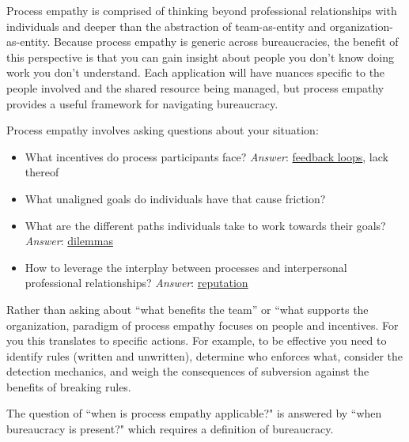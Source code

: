 Process empathy is comprised of thinking beyond professional relationships with individuals and deeper than the abstraction of team-as-entity and organization-as-entity. 
Because process empathy is generic across bureaucracies, the benefit of this perspective is that you can gain insight about people you don't know doing work you don't understand.
Each application will have nuances specific to the people involved and the shared resource being managed, but process empathy provides a useful framework for navigating bureaucracy.


Process empathy involves asking questions about your situation:
\begin{itemize}
    \item What incentives do process participants face?
\textit{Answer}:  \hyperref[sec:feedback-loop-and-ripples]{feedback loops}, lack thereof
    \item What unaligned goals do individuals have that cause friction?
    \item What are the different paths individuals take to work towards their goals?
\textit{Answer}:  \hyperref[sec:dilemma-trilemma]{dilemmas}
    \item How to leverage the interplay between processes and interpersonal professional relationships?
\textit{Answer}:  \hyperref[sec:reputation]{reputation}
\end{itemize}

Rather than asking about ``what benefits the team'' or ``what supports the organization, paradigm of process empathy focuses on people and incentives. For you this translates to specific actions. For example, to be effective you need to 
identify rules (written and unwritten), determine who enforces what, consider the detection mechanics, and weigh the consequences of subversion against the benefits of breaking rules.


The question of ``when is process empathy applicable?" is answered by ``when bureaucracy is present?" which requires a definition of bureaucracy. 
